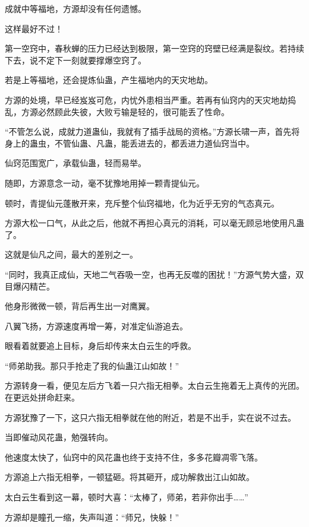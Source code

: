 
\begin{this_body}

成就中等福地，方源却没有任何遗憾。

这样最好不过！

第一空窍中，春秋蝉的压力已经达到极限，第一空窍的窍壁已经满是裂纹。若持续下去，说不定下一刻就要撑爆空窍了。

若是上等福地，还会提炼仙蛊，产生福地内的天灾地劫。

方源的处境，早已经岌岌可危，内忧外患相当严重。若再有仙窍内的天灾地劫捣乱，方源必然顾此失彼，大败亏输是轻的，很可能丢了性命。

“不管怎么说，成就力道蛊仙，我就有了插手战局的资格。”方源长啸一声，首先将身上的蛊虫，不管仙蛊、凡蛊，能丢进去的，都丢进力道仙窍当中。

仙窍范围宽广，承载仙蛊，轻而易举。

随即，方源意念一动，毫不犹豫地用掉一颗青提仙元。

顿时，青提仙元蓬散开来，充斥整个仙窍福地，化为近乎无穷的气态真元。

方源大松一口气，从此之后，他就不再担心真元的消耗，可以毫无顾忌地使用凡蛊了。

这就是仙凡之间，最大的差别之一。

“同时，我真正成仙，天地二气吞吸一空，也再无反噬的困扰！”方源气势大盛，双目爆闪精芒。

他身形微微一顿，背后再生出一对鹰翼。

八翼飞扬，方源速度再增一筹，对准定仙游追去。

眼看着就要追上目标，身后却传来太白云生的呼救。

“师弟助我。那只手抢走了我的仙蛊江山如故！”

方源转身一看，便见左后方飞着一只六指无相拳。太白云生拖着无上真传的光团。在更远处拼命赶来。

方源犹豫了一下，这只六指无相拳就在他的附近，若是不出手，实在说不过去。

当即催动风花蛊，勉强转向。

他速度太快了，仙窍中的风花蛊也终于支持不住，多多花瓣凋零飞落。

方源追上六指无相拳，一顿猛砸。将其砸开，成功解救出江山如故。

太白云生看到这一幕，顿时大喜：“太棒了，师弟，若非你出手……”

方源却是瞳孔一缩，失声叫道：“师兄，快躲！”


\end{this_body}
